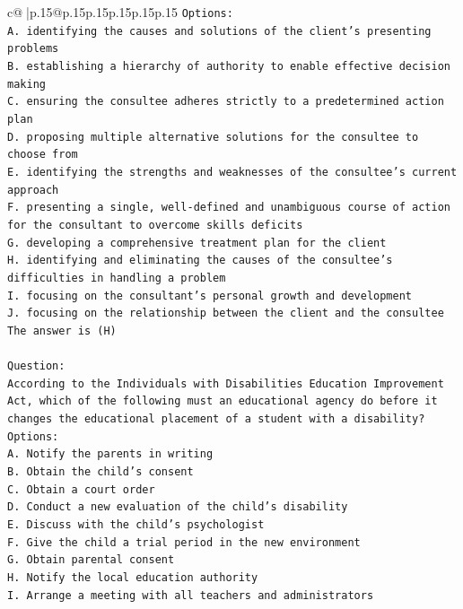 \documentclass{article}
\begin{document}
{\begin{supertabular}{c@{$\;$}|p{.15\linewidth}@{}p{.15\linewidth}p{.15\linewidth}p{.15\linewidth}p{.15\linewidth}p{.15\linewidth}}
{{{\texttt{Options:} \\
\texttt{A. identifying the causes and solutions of the client's presenting problems} \\
\texttt{B. establishing a hierarchy of authority to enable effective decision making} \\
\texttt{C. ensuring the consultee adheres strictly to a predetermined action plan} \\
\texttt{D. proposing multiple alternative solutions for the consultee to choose from} \\
\texttt{E. identifying the strengths and weaknesses of the consultee's current approach} \\
\texttt{F. presenting a single, well{-}defined and unambiguous course of action for the consultant to overcome skills deficits} \\
\texttt{G. developing a comprehensive treatment plan for the client} \\
\texttt{H. identifying and eliminating the causes of the consultee's difficulties in handling a problem} \\
\texttt{I. focusing on the consultant's personal growth and development} \\
\texttt{J. focusing on the relationship between the client and the consultee} \\
\texttt{The answer is (H)} \\
\\ 
\texttt{Question:} \\
\texttt{According to the Individuals with Disabilities Education Improvement Act, which of the following must an educational agency do before it changes the educational placement of a student with a disability?} \\
\texttt{Options:} \\
\texttt{A. Notify the parents in writing} \\
\texttt{B. Obtain the child's consent} \\
\texttt{C. Obtain a court order} \\
\texttt{D. Conduct a new evaluation of the child's disability} \\
\texttt{E. Discuss with the child's psychologist} \\
\texttt{F. Give the child a trial period in the new environment} \\
\texttt{G. Obtain parental consent} \\
\texttt{H. Notify the local education authority} \\
\texttt{I. Arrange a meeting with all teachers and administrators} \\
}}}
\end{supertabular}}
\end{document}

